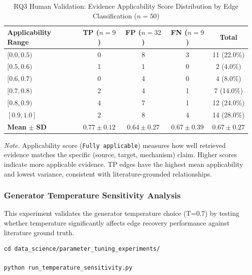 \begin{table}[H]
\centering
\caption{RQ3 Human Validation: Evidence Applicability Score Distribution by Edge Classification ($n=50$)}
\label{tab:rq3_applicability_distribution}
\begin{threeparttable}
\begin{tabular}{lcccc}
\toprule
\textbf{Applicability Range} & \textbf{TP} ($n=9$) & \textbf{FP} ($n=32$) & \textbf{FN} ($n=9$) & \textbf{Total} \\
\midrule
$[0.0, 0.5)$ & 0 & 8 & 3 & 11 (22.0\%) \\
$[0.5, 0.6)$ & 1 & 1 & 0 & 2 (4.0\%) \\
$[0.6, 0.7)$ & 0 & 4 & 0 & 4 (8.0\%) \\
$[0.7, 0.8)$ & 2 & 4 & 1 & 7 (14.0\%) \\
$[0.8, 0.9)$ & 4 & 7 & 1 & 12 (24.0\%) \\
$[0.9, 1.0]$ & 2 & 8 & 4 & 14 (28.0\%) \\
\midrule
\textbf{Mean} $\pm$ \textbf{SD} & $0.77 \pm 0.12$ & $0.64 \pm 0.27$ & $0.67 \pm 0.39$ & $0.67 \pm 0.27$ \\
\bottomrule
\end{tabular}
\begin{tablenotes}
\small
\item \textit{Note.} Applicability score (\texttt{Fully applicable}) measures how well retrieved evidence matches the specific (source, target, mechanism) claim. Higher scores indicate more applicable evidence. TP edges have the highest mean applicability and lowest variance, consistent with literature-grounded relationships.
\end{tablenotes}
\end{threeparttable}
\end{table}

\subsubsection{Generator Temperature Sensitivity Analysis}

This experiment validates the generator temperature choice (T=0.7) by testing whether temperature significantly affects edge recovery performance against literature ground truth.

\begin{verbatim}
cd data_science/parameter_tuning_experiments/

python run_temperature_sensitivity.py
\end{verbatim}

